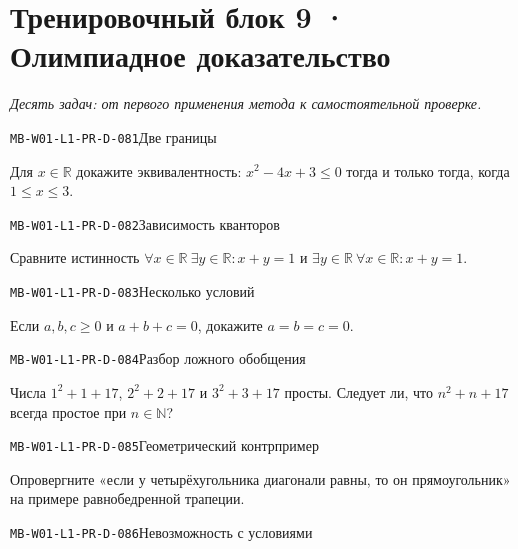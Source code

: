 \documentclass[11pt,a4paper,openany]{book}
\newcommand{\muid}[1]{\texttt{\footnotesize #1}}
\begin{document}
\clearpage\section{Тренировочный блок 9 · Олимпиадное доказательство}

\textit{Десять задач: от первого применения метода к самостоятельной проверке.}\par

\noindent\hypertarget{MB-W01-L1-PR-D-081}{}\muid{MB-W01-L1-PR-D-081}\quad Две границы\par

Для $x\in\mathbb R$ докажите эквивалентность: $x^2-4x+3\le0$ тогда и только тогда, когда $1\le x\le3$.\par\medskip

\noindent\hypertarget{MB-W01-L1-PR-D-082}{}\muid{MB-W01-L1-PR-D-082}\quad Зависимость кванторов\par

Сравните истинность $\forall x\in\mathbb R\ \exists y\in\mathbb R\colon x+y=1$ и $\exists y\in\mathbb R\ \forall x\in\mathbb R\colon x+y=1$.\par\medskip

\noindent\hypertarget{MB-W01-L1-PR-D-083}{}\muid{MB-W01-L1-PR-D-083}\quad Несколько условий\par

Если $a,b,c\ge0$ и $a+b+c=0$, докажите $a=b=c=0$.\par\medskip

\noindent\hypertarget{MB-W01-L1-PR-D-084}{}\muid{MB-W01-L1-PR-D-084}\quad Разбор ложного обобщения\par

Числа $1^2+1+17$, $2^2+2+17$ и $3^2+3+17$ просты. Следует ли, что $n^2+n+17$ всегда простое при $n\in\mathbb N$?\par\medskip

\noindent\hypertarget{MB-W01-L1-PR-D-085}{}\muid{MB-W01-L1-PR-D-085}\quad Геометрический контрпример\par

Опровергните «если у четырёхугольника диагонали равны, то он прямоугольник» на примере равнобедренной трапеции.\par\medskip

\noindent\hypertarget{MB-W01-L1-PR-D-086}{}\muid{MB-W01-L1-PR-D-086}\quad Невозможность с условиями\par
\end{document}
